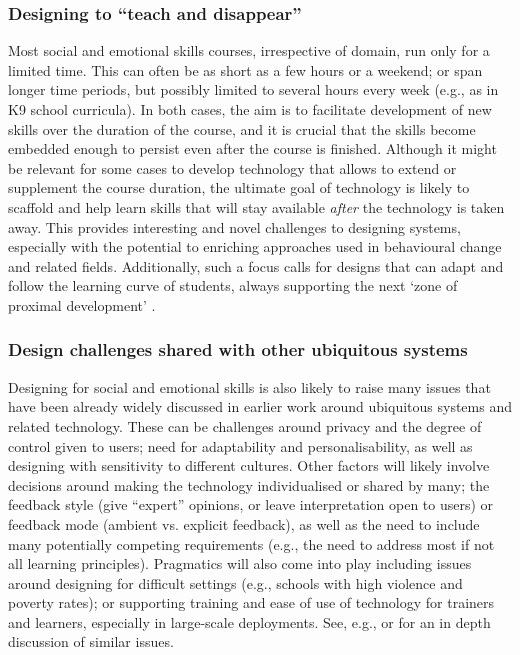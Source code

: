 \documentclass[prodmode,acmtochi]{acmsmall}
\begin{document}

\subsubsection{Designing to ``teach and disappear''} Most social and emotional skills courses, irrespective of domain, run only for a limited time. This can often be as short as a few hours or a weekend; or span longer time periods, but possibly limited to several hours every week (e.g., as in K9 school curricula). 
In both cases, the aim is to facilitate development of new skills over the duration of the course, and it is crucial that the skills become embedded enough to persist even after the course is finished. 
Although it might be relevant for some cases to develop technology that allows to extend or supplement the course duration, the ultimate goal of technology is likely to scaffold and help learn skills that will stay available \emph{after} the technology is taken away. This provides interesting and novel challenges to designing systems, especially with the potential to enriching approaches used in behavioural change and related fields. Additionally, such a focus calls for designs that can adapt and follow the learning curve of students, always supporting the next `zone of proximal development' \cite{vygotsky1987collected}. 


\subsubsection{Design challenges shared with other ubiquitous systems}
        Designing for social and emotional skills is also likely to raise many issues that have been already widely discussed in earlier work around ubiquitous systems and related technology. These can be challenges around privacy and the degree of control given to users; need for adaptability and personalisability, as well as designing with sensitivity to different cultures. Other factors will likely involve decisions around making the technology individualised or shared by many; the feedback style (give ``expert'' opinions, or leave interpretation open to users) or feedback mode (ambient vs. explicit feedback), as well as the need to include many potentially competing requirements (e.g., the need to address most if not all learning principles). Pragmatics will also come into play including issues around designing for difficult settings (e.g., schools with high violence and poverty rates); or supporting training and ease of use of technology for trainers and learners, especially in large-scale deployments.  %
See, e.g.,  or  for an in depth discussion of similar issues.
\end{document}
